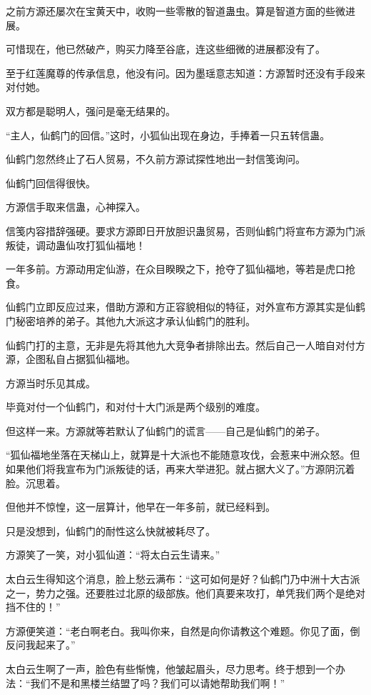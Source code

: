 \begin{this_body}
之前方源还屡次在宝黄天中，收购一些零散的智道蛊虫。算是智道方面的些微进展。

可惜现在，他已然破产，购买力降至谷底，连这些细微的进展都没有了。

至于红莲魔尊的传承信息，他没有问。因为墨瑶意志知道：方源暂时还没有手段来对付她。

双方都是聪明人，强问是毫无结果的。

“主人，仙鹤门的回信。”这时，小狐仙出现在身边，手捧着一只五转信蛊。

仙鹤门忽然终止了石人贸易，不久前方源试探性地出一封信笺询问。

仙鹤门回信得很快。

方源信手取来信蛊，心神探入。

信笺内容措辞强硬。要求方源即日开放胆识蛊贸易，否则仙鹤门将宣布方源为门派叛徒，调动蛊仙攻打狐仙福地！

一年多前。方源动用定仙游，在众目睽睽之下，抢夺了狐仙福地，等若是虎口抢食。

仙鹤门立即反应过来，借助方源和方正容貌相似的特征，对外宣布方源其实是仙鹤门秘密培养的弟子。其他九大派这才承认仙鹤门的胜利。

仙鹤门打的主意，无非是先将其他九大竞争者排除出去。然后自己一人暗自对付方源，企图私自占据狐仙福地。

方源当时乐见其成。

毕竟对付一个仙鹤门，和对付十大门派是两个级别的难度。

但这样一来。方源就等若默认了仙鹤门的谎言——自己是仙鹤门的弟子。

“狐仙福地坐落在天梯山上，就算是十大派也不能随意攻伐，会惹来中洲众怒。但如果他们将我宣布为门派叛徒的话，再来大举进犯。就占据大义了。”方源阴沉着脸。沉思着。

但他并不惊惶，这一层算计，他早在一年多前，就已经料到。

只是没想到，仙鹤门的耐性这么快就被耗尽了。

方源笑了一笑，对小狐仙道：“将太白云生请来。”

太白云生得知这个消息，脸上愁云满布：“这可如何是好？仙鹤门乃中洲十大古派之一，势力之强。还要胜过北原的级部族。他们真要来攻打，单凭我们两个是绝对挡不住的！”

方源便笑道：“老白啊老白。我叫你来，自然是向你请教这个难题。你见了面，倒反问我起来了。”

太白云生啊了一声，脸色有些惭愧，他皱起眉头，尽力思考。终于想到一个办法：“我们不是和黑楼兰结盟了吗？我们可以请她帮助我们啊！”


\end{this_body}

